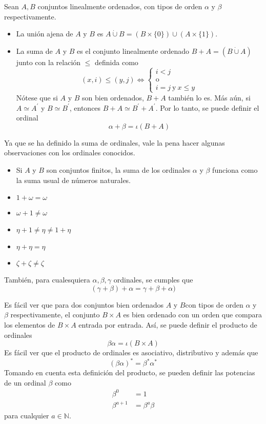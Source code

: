 \begin{defn}
  Sean $A,B$ conjuntos linealmente ordenados, con tipos de orden $\alpha$ y $\beta$ respectivamente.
  \begin{itemize}
      \item La unión ajena de $A$ y $B$ es $A\dot\cup B=(B\times\{0\})\cup(A\times\{1\})$.
      \item La suma de $A$ y $B$ es el conjunto linealmente ordenado $B+A=(B\dot\cup A)$ junto con la relación $\leq$ definida como
      $$(x,i)\leq(y,j)\iff\begin{cases}
          i<j\\
          \text{o}\\
          i=j \ \text{y} \ x\leq y
      \end{cases}$$
      Nótese que si $A$ y $B$ son bien ordenados, $B+A$ también lo es. Más aún, si $A\simeq A^\prime$ y $B\simeq B^\prime$, entonces $B+A\simeq B^\prime+A^\prime$. Por lo tanto, se puede definir el ordinal
      $$\alpha+\beta=\iota(B+A)$$
  \end{itemize}
\end{defn}
Ya que se ha definido la suma de ordinales, vale la pena hacer algunas observaciones con los ordinales conocidos.
\begin{exa}
    \leavevmode
   \begin{itemize}
       \item Si $A$ y $B$ son conjuntos finitos, la suma de los ordinales $\alpha$ y $\beta$ funciona como la suma usual de números naturales.
       \item $1+\omega=\omega$
       \item $\omega+1\neq\omega$
       \item $\eta+1\neq \eta \neq 1+\eta$
       \item $\eta+\eta=\eta$
       \item $\zeta+\zeta\neq\zeta$
   \end{itemize} 
   También, para cualesquiera $\alpha,\beta,\gamma$ ordinales, se cumples que 
   $$(\gamma+\beta)+\alpha=\gamma+\beta+\alpha)$$
\end{exa}
\begin{defn}
  Es fácil ver que para dos conjuntos bien ordenados $A$ y $B$con tipos de orden $\alpha$ y $\beta$ respectivamente, el conjunto $B\times A$ es bien ordenado con un orden que compara los elementos de $B\times A$ entrada por entrada. Así, se puede definir el producto de ordinales
  $$\beta\alpha=\iota(B\times A)$$
  Es fácil ver que el producto de ordinales es asociativo, distributivo y además que 
  $$(\beta\alpha)^*=\beta^*\alpha^*$$
  Tomando en cuenta esta definición del producto, se pueden definir las potencias de un ordinal $\beta$ como
  \begin{align*}
      \beta^0&=1\\
      \beta^{a+1}&=\beta^{a}\beta
  \end{align*}
  para cualquier $a\in\mathbb{N}$.
\end{defn}
